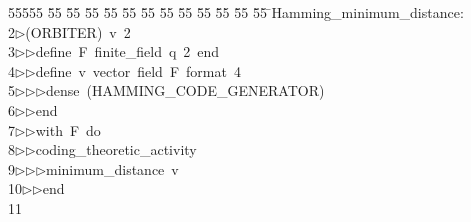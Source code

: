 %
%
\begin{tabbing}
55555 \= 55 \= 55 \= 55 \= 55 \= 55 \= 55 \= 55 \= 55 \= 55 \= 55 \= 55 \= 55 \= \>Hamming\_minimum\_distance:\\[0pt]
2\>$\triangleright$\>(ORBITER)\ v\ 2\ \\[0pt]
3\>$\triangleright$\>$\triangleright$\>define\ F\ finite\_field\ q\ 2\ end\ \\[0pt]
4\>$\triangleright$\>$\triangleright$\>define\ v\ vector\ field\ F\ format\ 4\ \\[0pt]
5\>$\triangleright$\>$\triangleright$\>$\triangleright$\>dense\ (HAMMING\_CODE\_GENERATOR)\ \\[0pt]
6\>$\triangleright$\>$\triangleright$\>end\ \\[0pt]
7\>$\triangleright$\>$\triangleright$\>with\ F\ do\ \\[0pt]
8\>$\triangleright$\>$\triangleright$\>coding\_theoretic\_activity\ \\[0pt]
9\>$\triangleright$\>$\triangleright$\>$\triangleright$\>minimum\_distance\ v\ \\[0pt]
10\>$\triangleright$\>$\triangleright$\>end\\[0pt]
11\>\end{tabbing}
